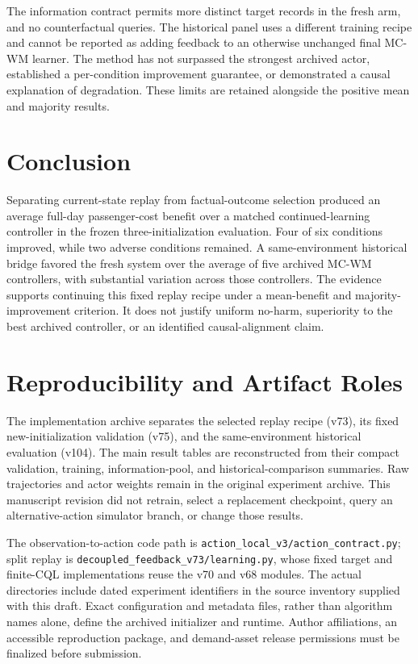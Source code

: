 \documentclass[journal]{IEEEtran}
\begin{document}
The information contract permits more distinct target records in the fresh arm, and no counterfactual queries. The historical panel uses a different training recipe and cannot be reported as adding feedback to an otherwise unchanged final MC-WM learner. The method has not surpassed the strongest archived actor, established a per-condition improvement guarantee, or demonstrated a causal explanation of degradation. These limits are retained alongside the positive mean and majority results.

\section{Conclusion}
Separating current-state replay from factual-outcome selection produced an average full-day passenger-cost benefit over a matched continued-learning controller in the frozen three-initialization evaluation. Four of six conditions improved, while two adverse conditions remained. A same-environment historical bridge favored the fresh system over the average of five archived MC-WM controllers, with substantial variation across those controllers. The evidence supports continuing this fixed replay recipe under a mean-benefit and majority-improvement criterion. It does not justify uniform no-harm, superiority to the best archived controller, or an identified causal-alignment claim.

\appendices
\section{Reproducibility and Artifact Roles}
The implementation archive separates the selected replay recipe (v73), its fixed new-initialization validation (v75), and the same-environment historical evaluation (v104). The main result tables are reconstructed from their compact validation, training, information-pool, and historical-comparison summaries. Raw trajectories and actor weights remain in the original experiment archive. This manuscript revision did not retrain, select a replacement checkpoint, query an alternative-action simulator branch, or change those results.

The observation-to-action code path is \texttt{action\_local\_v3/action\_contract.py}; split replay is \texttt{decoupled\_feedback\_v73/learning.py}, whose fixed target and finite-CQL implementations reuse the v70 and v68 modules. The actual directories include dated experiment identifiers in the source inventory supplied with this draft. Exact configuration and metadata files, rather than algorithm names alone, define the archived initializer and runtime. Author affiliations, an accessible reproduction package, and demand-asset release permissions must be finalized before submission.



\end{document}
